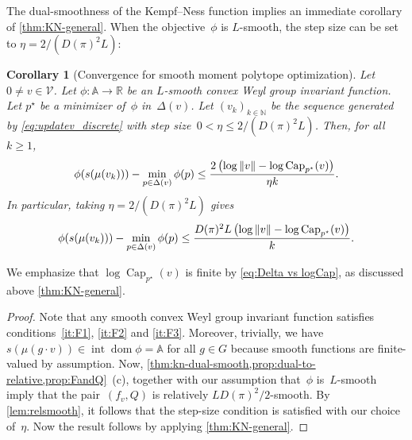 \documentclass[11pt,letterpaper]{article}
\newtheorem{corollary}[theorem]{Corollary}\AddToHook{env/corollary/begin}{\crefalias{theorem}{corollary}}
\numberwithin{equation}{section}
\renewcommand{\AA}{\mathbb{A}}
\newcommand{\RR}{\mathbb{R}}
\newcommand{\NN}{\mathbb{N}}
\newcommand{\VV}{\mathcal{V}}
\DeclareMathOperator{\intr}{int}
\DeclareMathOperator{\dom}{dom}
\DeclareMathOperator{\Capacity}{Cap}
\begin{document}
The dual-smoothness of the Kempf--Ness function implies an immediate corollary of \cref{thm:KN-general}.
When the objective~$\phi$ is $L$-smooth, the step size can be set to $\eta = 2/(D(\pi)^2 L)$:

\begin{corollary}[Convergence for smooth moment polytope optimization]\label{cor:KN-Qsmooth}
    Let $0 \neq v \in \VV$.
    Let $\phi \colon \AA \to \RR$ be an $L$-smooth convex Weyl group invariant function.
    Let $p^\star$ be a minimizer of~$\phi$ in~$\Delta(v)$.
    Let $(v_k)_{k \in \NN}$ be the sequence generated by \cref{eq:updatev_discrete} with step size~$0 < \eta \leq 2/(D(\pi)^2 L)$.
    Then, for all $k\geq1$,
    \[
        \phi\mleft(s(\mu(v_k))\mright) - \min_{p \in \Delta(v)}\phi(p) \le \frac{2 \left( \log\|v\| - \log\Capacity_{p^\star}(v) \right)}{\eta k}.
    \]
    In particular, taking $\eta = 2/(D(\pi)^2 L)$ gives
    \[
        \phi\mleft(s(\mu(v_k))\mright) - \min_{p \in \Delta(v)}\phi(p) \le \frac{D(\pi)^2 L \left( \log\|v\| - \log\Capacity_{p^\star}(v) \right)}k.
    \]
\end{corollary}
\noindent We emphasize that $\log\Capacity_{p^\star}(v)$ is finite by \cref{eq:Delta vs logCap}, as discussed above \cref{thm:KN-general}.
\begin{proof}
Note that any smooth convex Weyl group invariant function satisfies conditions~\ref{it:F1}, \ref{it:F2} and \ref{it:F3}.
Moreover, trivially, we have $s(\mu(g\cdot v)) \in \intr\dom\phi = \AA$ for all $g \in G$ because smooth functions are finite-valued by assumption.
Now, \cref{thm:kn-dual-smooth,prop:dual-to-relative,prop:FandQ}~(c), together with our assumption that~$\phi$ is~$L$-smooth imply that the pair~$(f_v,Q)$ is relatively $L D(\pi)^2/2$-smooth.
By \cref{lem:relsmooth}, it follows that the step-size condition is satisfied with our choice of~$\eta$.
Now the result follows by applying \cref{thm:KN-general}.
\end{proof}
\end{document}
